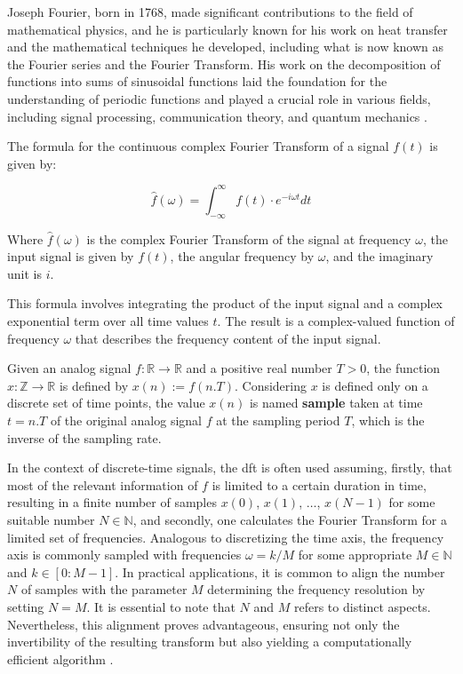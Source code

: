 Joseph Fourier, born in 1768, made significant contributions to the field of mathematical physics, and he is particularly known for his work on heat transfer and the mathematical techniques he developed, including what is now known as the Fourier series and the Fourier Transform. His work on the decomposition of functions into sums of sinusoidal functions laid the foundation for the understanding of periodic functions and played a crucial role in various fields, including signal processing, communication theory, and quantum mechanics \cite{Debnath2014}.

The formula for the continuous complex Fourier Transform of a signal $f(t)$ is given by:

\begin{equation}
    \label{eq:frmwk_audio_fund_fft}
    \hat{f}(\omega)=\int_{-\infty}^{\infty} f(t) \cdot e^{-i \omega t} d t
\end{equation}

Where $\hat{f}(\omega)$ is the complex Fourier Transform of the signal at frequency $\omega$, the input signal is given by $f(t)$, the angular frequency by $\omega$, and the imaginary unit is $i$.

This formula involves integrating the product of the input signal and a complex exponential term over all time values $t$. The result is a complex-valued function of frequency $\omega$ that describes the frequency content of the input signal.

Given an analog signal $f : \mathbb{R} \rightarrow \mathbb{R}$ and a positive real number $T > 0$, the function $x : \mathbb{Z} \rightarrow \mathbb{R}$ is defined by $x(n):= f(n.T)$. Considering $x$ is defined only on a discrete set of time points, the value $x(n)$ is named \textbf{sample} taken at time $t = n.T$ of the original analog signal $f$ at the sampling period $T$, which is the inverse of the sampling rate.

In the context of discrete-time signals, the \gls{dft} is often used assuming, firstly, that most of the relevant information of $f$ is limited to a certain duration in time, resulting in a finite number of samples $x(0)$, $x(1)$, $\ldots$, $x(N-1)$ for some suitable number $N\in\mathbb{N} $, and secondly, one calculates the Fourier Transform for a limited set of frequencies. Analogous to discretizing the time axis, the frequency axis is commonly sampled with frequencies $\omega = k/M$ for some appropriate $M\in\mathbb{N} $ and $k \in [0: M-1]$. In practical applications, it is common to align the number $N$ of samples with the parameter $M$ determining the frequency resolution by setting $N = M$. It is essential to note that $N$ and $M$ refers to distinct aspects. Nevertheless, this alignment proves advantageous, ensuring not only the invertibility of the resulting transform but also yielding a computationally efficient algorithm \cite{Mueller2021}.

